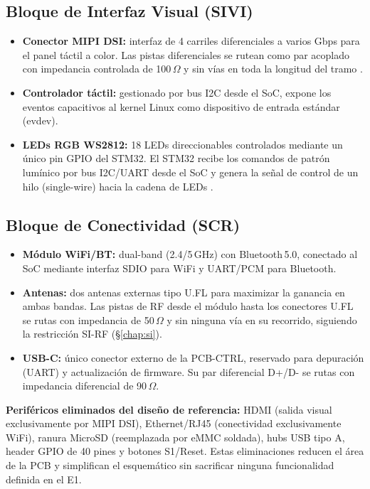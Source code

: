 \subsection{Bloque de Interfaz Visual (SIVI)}

\begin{itemize}
  \item \textbf{Conector MIPI DSI:} interfaz de 4 carriles diferenciales a varios Gbps para el panel táctil a color. Las pistas diferenciales se rutean como par acoplado con impedancia controlada de 100\,$\Omega$ y sin vías en toda la longitud del tramo .
  \item \textbf{Controlador táctil:} gestionado por bus I2C desde el SoC, expone los eventos capacitivos al kernel Linux como dispositivo de entrada estándar (evdev).
  \item \textbf{LEDs RGB WS2812:} 18 LEDs direccionables controlados mediante un único pin GPIO del STM32. El STM32 recibe los comandos de patrón lumínico por bus I2C/UART desde el SoC y genera la señal de control de un hilo (single-wire) hacia la cadena de LEDs .
\end{itemize}

\subsection{Bloque de Conectividad (SCR)}

\begin{itemize}
  \item \textbf{Módulo WiFi/BT:} dual-band (2.4/5\,GHz) con Bluetooth\,5.0, conectado al SoC mediante interfaz SDIO para WiFi y UART/PCM para Bluetooth.
  \item \textbf{Antenas:} dos antenas externas tipo U.FL para maximizar la ganancia en ambas bandas. Las pistas de RF desde el módulo hasta los conectores U.FL se rutas con impedancia de 50\,$\Omega$ y sin ninguna vía en su recorrido, siguiendo la restricción SI-RF (\S\ref{chap:si}).
  \item \textbf{USB-C:} único conector externo de la PCB-CTRL, reservado para depuración (UART) y actualización de firmware. Su par diferencial D+/D- se rutas con impedancia diferencial de 90\,$\Omega$.
\end{itemize}

\textbf{Periféricos eliminados del diseño de referencia:} HDMI (salida visual exclusivamente por MIPI DSI), Ethernet/RJ45 (conectividad exclusivamente WiFi), ranura MicroSD (reemplazada por eMMC soldada), hubs USB tipo A, header GPIO de 40 pines y botones S1/Reset. Estas eliminaciones reducen el área de la PCB y simplifican el esquemático sin sacrificar ninguna funcionalidad definida en el E1.


